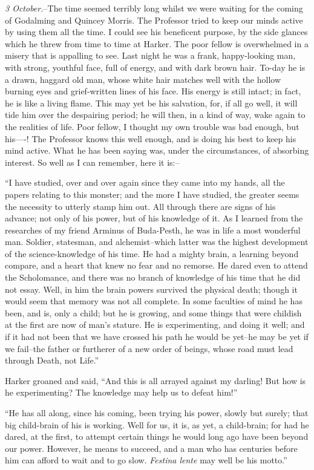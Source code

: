 \documentclass[12pt,openright]{book}
\begin{document}
\textit{3 October.}–The time seemed terribly long whilst we were waiting for the coming of Godalming and Quincey Morris. The Professor tried to keep our minds active by using them all the time. I could see his beneficent purpose, by the side glances which he threw from time to time at Harker. The poor fellow is overwhelmed in a misery that is appalling to see. Last night he was a frank, happy-looking man, with strong, youthful face, full of energy, and with dark brown hair. To-day he is a drawn, haggard old man, whose white hair matches well with the hollow burning eyes and grief-written lines of his face. His energy is still intact; in fact, he is like a living flame. This may yet be his salvation, for, if all go well, it will tide him over the despairing period; he will then, in a kind of way, wake again to the realities of life. Poor fellow, I thought my own trouble was bad enough, but his—-! The Professor knows this well enough, and is doing his best to keep his mind active. What he has been saying was, under the circumstances, of absorbing interest. So well as I can remember, here it is:–

“I have studied, over and over again since they came into my hands, all the papers relating to this monster; and the more I have studied, the greater seems the necessity to utterly stamp him out. All through there are signs of his advance; not only of his power, but of his knowledge of it. As I learned from the researches of my friend Arminus of Buda-Pesth, he was in life a most wonderful man. Soldier, statesman, and alchemist–which latter was the highest development of the science-knowledge of his time. He had a mighty brain, a learning beyond compare, and a heart that knew no fear and no remorse. He dared even to attend the Scholomance, and there was no branch of knowledge of his time that he did not essay. Well, in him the brain powers survived the physical death; though it would seem that memory was not all complete. In some faculties of mind he has been, and is, only a child; but he is growing, and some things that were childish at the first are now of man’s stature. He is experimenting, and doing it well; and if it had not been that we have crossed his path he would be yet–he may be yet if we fail–the father or furtherer of a new order of beings, whose road must lead through Death, not Life.”

Harker groaned and said, “And this is all arrayed against my darling! But how is he experimenting? The knowledge may help us to defeat him!”

“He has all along, since his coming, been trying his power, slowly but surely; that big child-brain of his is working. Well for us, it is, as yet, a child-brain; for had he dared, at the first, to attempt certain things he would long ago have been beyond our power. However, he means to succeed, and a man who has centuries before him can afford to wait and to go slow. \textit{Festina lente} may well be his motto.”
\end{document}
